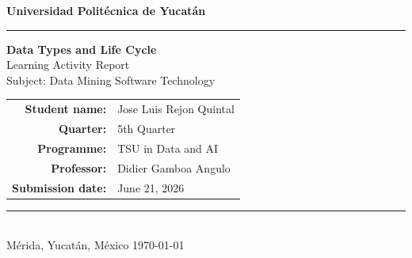 \documentclass[12pt, a4paper]{article}
\newcommand{\StudentName}   {Jose Luis Rejon Quintal}   %
\newcommand{\MyCuatrimestre}{5th Quarter}               %
\newcommand{\MyGroup}       {TSU in Data and AI}        %
\newcommand{\MyProfessor}   {Didier Gamboa Angulo}      %
\newcommand{\MyDate}        {June 21, 2026}             %
\newcommand{\UniversityName}{Universidad Polit\'{e}cnica de Yucat\'{a}n} %
\begin{document}
\thispagestyle{empty}

\begin{center}

  {\large\bfseries \UniversityName}\\[8pt]   %
  \textcolor{aqRule}{\rule{\textwidth}{1.5pt}}

  \vspace{2.5cm}

  {\LARGE\bfseries Data Types and Life Cycle}\\[10pt]
  {\large Learning Activity Report}\\[6pt]
  {\normalsize Subject: Data Mining \quad\textbullet\quad Software Technology}

  \vspace{3.0cm}

  \begin{tabular}{>{\bfseries}r p{9cm}}
    Student name:    & \StudentName   \\[12pt]   %
    Quarter:         & \MyCuatrimestre\\[12pt]   %
    Programme:       & \MyGroup       \\[12pt]   %
    Professor:       & \MyProfessor   \\[12pt]   %
    Submission date: & \MyDate        \\         %
  \end{tabular}

  \vspace{2.5cm}

  \textcolor{aqRule}{\rule{\textwidth}{0.6pt}}\\[4pt]
  {\small M\'{e}rida, Yucat\'{a}n, M\'{e}xico \quad\textbullet\quad \today}

\end{center}

\newpage

\tableofcontents
\newpage
\end{document}
